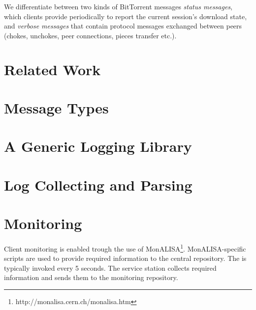 We differentiate between two kinds of BitTorrent messages \textit{status
messages}, which clients provide periodically to report the current session’s
download state, and \textit{verbose messages} that contain protocol messages
exchanged between peers (chokes, unchokes, peer connections, pieces transfer
etc.).

\section{Related Work}
\label{sec:proto-measure:related}


\section{Message Types}
\label{sec:proto-measure:message-types}


\section{A Generic Logging Library}
\label{sec:proto-measure:log-library}


\section{Log Collecting and Parsing}
\label{sec:proto-measure:log-collect-parse}


\section{Monitoring}
\label{sec:monitoring}

Client monitoring is enabled trough the use of
MonALISA\footnote{http://monalisa.cern.ch/monalisa.htm}. MonALISA-specific
scripts are used to provide required information to the central repository.
The is typically invoked every 5 seconds. The service station collects
required information and sends them to the monitoring repository.

